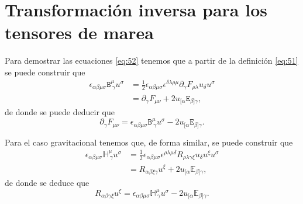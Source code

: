 \chapter{Transformación inversa para los tensores de marea}
\label{ape:4}

Para demostrar las ecuaciones \eqref{eq:52} tenemos que a partir de la definición \eqref{eq:51} se puede construir que
\begin{align}
\epsilon_{\alpha \beta \mu \sigma} \mathtt{B}^{\mu}_{\ \gamma} u^{\sigma} &= \frac{1}{2} \epsilon_{\alpha \beta \mu \sigma} \epsilon^{\delta \lambda \rho \mu} \partial_{\gamma} F_{\rho \lambda} u_{\delta} u^{\sigma}\\
&= \partial_{\gamma} F_{\mu \nu} + 2u_{[\alpha} \mathtt{E_{\beta] \gamma}},
\end{align}
de donde se puede deducir que
\begin{equation}
\partial_{\gamma} F_{\mu \nu} =  \epsilon_{\alpha \beta \mu \sigma} \mathtt{B}^{\mu}_{\ \gamma} u^{\sigma} - 2u_{[\alpha} \mathtt{E_{\beta] \gamma}}.
\end{equation}

Para el caso gravitacional tenemos que, de forma similar, se puede construir que
\begin{align}
\epsilon_{\alpha \beta \mu \sigma} \mathbb{H}^{\mu}_{\ \gamma} u^{\sigma} &= \frac{1}{2} \epsilon_{\alpha \beta \mu \sigma} \epsilon^{\rho \lambda \mu \delta} R_{\rho \lambda \gamma \xi} u_{\delta} u^{\xi} u^{\sigma}\\
&= R_{\alpha \beta \xi \gamma} u^{\xi} + 2u_{[\alpha} \mathbb{E}_{\beta] \gamma},
\end{align}
de donde se deduce que
\begin{equation}
R_{\alpha \beta \gamma \xi} u^{\xi} = \epsilon_{\alpha \beta \mu \sigma} \mathbb{H}^{\mu}_{\ \gamma} u^{\sigma} - 2u_{[\alpha} \mathbb{E}_{\beta] \gamma}.
\end{equation}
